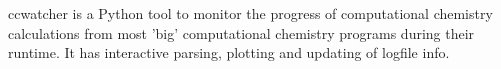ccwatcher is a Python tool to monitor the progress of computational chemistry calculations from most 'big' computational chemistry programs during their runtime. It has interactive parsing, plotting and updating of logfile info. 